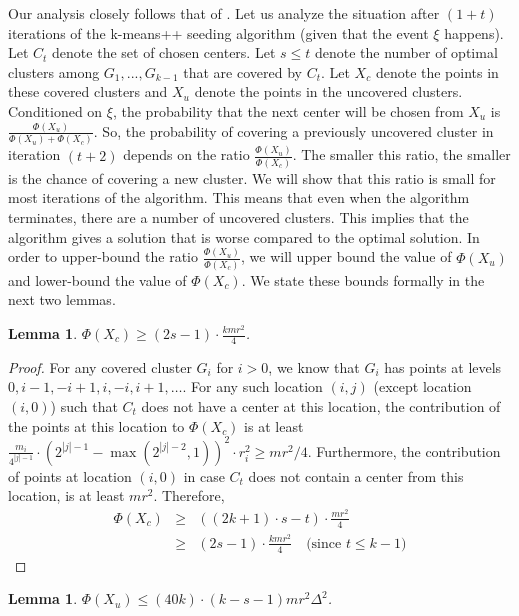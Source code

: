 \documentclass[11pt]{article}
\newtheorem{lemma}[theorem]{Lemma}
\begin{document}
Our analysis closely follows that of \cite{br12}. 
Let us analyze the situation after $(1 + t)$ iterations of the k-means++ seeding algorithm (given that the event $\xi$ happens).
Let $C_t$ denote the set of chosen centers.
Let $s \leq t$ denote the number of optimal clusters among $G_1, ..., G_{k-1}$ that are covered by $C_t$.
Let $X_c$ denote the points in these covered clusters and $X_u$ denote the points in the uncovered clusters.
Conditioned on $\xi$, the probability that the next center will be chosen from $X_u$ is $\frac{\Phi(X_u)}{\Phi(X_u) + \Phi(X_c)}$.
So, the probability of covering a previously uncovered cluster in iteration $(t+2)$ depends on the ratio $\frac{\Phi(X_u)}{\Phi(X_c)}$.
The smaller this ratio, the smaller is the chance of covering a new cluster.
We will show that this ratio is small for most iterations of the algorithm.
This means that even when the algorithm terminates, there are a number of uncovered clusters. 
This implies that the algorithm gives a solution that is worse compared to the optimal solution.
In order to upper-bound the ratio $\frac{\Phi(X_u)}{\Phi(X_c)}$, we will upper bound the value of $\Phi(X_u)$ and lower-bound the value of $\Phi(X_c)$.
We state these bounds formally in the next two lemmas.


\begin{lemma}\label{lemma:11}
$\Phi(X_c) \geq (2s - 1) \cdot \frac{k m r^2}{4}$.
\end{lemma}

\begin{proof}
For any covered cluster $G_i$ for $i>0$, we know that $G_i$ has points at levels $0, i-1, -i+1, i, -i, i+1, \ldots$.
For any such location $(i, j)$ (except location $(i, 0)$) such that $C_t$ does not have a center at this location, the contribution of the points at this location to $\Phi(X_c)$ is at least $\frac{m_i}{4^{|j|-1}} \cdot (2^{|j|-1} - \max(2^{|j|-2}, 1))^2 \cdot r_i^2 \geq mr^2/4 $. 
Furthermore, the contribution of points at location $(i, 0)$ in case $C_t$ does not contain a center from this location, is at least $mr^2$.
Therefore,
\begin{eqnarray*}
\Phi(X_c) &\geq& ((2k+1) \cdot s - t) \cdot \frac{mr^2}{4} \\
&\geq& (2s-1) \cdot \frac{k m r^2}{4} \quad \textrm{(since $t \leq k-1$)}
\end{eqnarray*}
\end{proof}


\begin{lemma}\label{lemma:12}
$\Phi(X_u) \leq (40 k) \cdot (k - s-1) m r^2 \Delta^2$.
\end{lemma}
\end{document}
